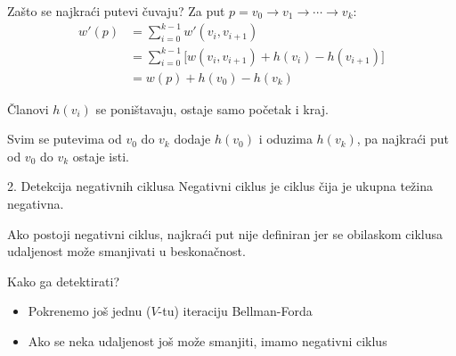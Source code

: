 \documentclass{beamer}
\begin{document}
\begin{frame}{Zašto se najkraći putevi čuvaju?}
  Za put $p = v_0 \to v_1 \to \cdots \to v_k$:
  \begin{align*}
    w'(p) &= \sum_{i=0}^{k-1} w'(v_i, v_{i+1}) \\
           &= \sum_{i=0}^{k-1} \bigl[ w(v_i, v_{i+1}) + h(v_i) - h(v_{i+1}) \bigr] \\
           &= w(p) + h(v_0) - h(v_k)
  \end{align*}

  Članovi $h(v_i)$ se poništavaju, ostaje samo početak i kraj.

  \vspace{0.5em}
  Svim se putevima od $v_0$ do $v_k$ dodaje $h(v_0)$ i oduzima
  $h(v_k)$, pa najkraći put od $v_0$ do $v_k$ ostaje isti.
\end{frame}


\begin{frame}{2. Detekcija negativnih ciklusa}
  Negativni ciklus je ciklus čija je ukupna težina negativna.

  \vspace{0.5em}
  Ako postoji negativni ciklus, najkraći put nije definiran jer se obilaskom ciklusa
  udaljenost može smanjivati u beskonačnost.

  \vspace{0.5em}
  Kako ga detektirati?
  \begin{itemize}
    \item Pokrenemo još jednu ($V$-tu) iteraciju Bellman-Forda
    \item Ako se neka udaljenost još može smanjiti, imamo negativni ciklus
  \end{itemize}

\end{frame}


\end{document}
